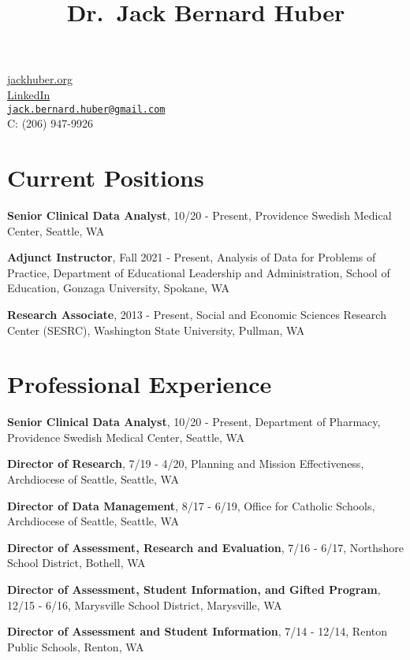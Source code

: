\documentclass[
  letterpaper,
]{article}
\title{Dr.~Jack Bernard Huber}
\author{}
\date{}
\begin{document}
\maketitle


\href{https://jackhuber.org}{jackhuber.org}\\
\href{https://www.linkedin.com/in/jackbhuber}{LinkedIn}\\
\href{mailto:jack.bernard.huber@gmail.com}{\nolinkurl{jack.bernard.huber@gmail.com}}\\
C: (206) 947-9926

\section{Current Positions}\label{current-positions}

\textbf{Senior Clinical Data Analyst}, 10/20 - Present, Providence
Swedish Medical Center, Seattle, WA

\textbf{Adjunct Instructor}, Fall 2021 - Present, Analysis of Data for
Problems of Practice, Department of Educational Leadership and
Administration, School of Education, Gonzaga University, Spokane, WA

\textbf{Research Associate}, 2013 - Present, Social and Economic
Sciences Research Center (SESRC), Washington State University, Pullman,
WA

\section{Professional Experience}\label{professional-experience}

\textbf{Senior Clinical Data Analyst}, 10/20 - Present, Department of
Pharmacy, Providence Swedish Medical Center, Seattle, WA

\textbf{Director of Research}, 7/19 - 4/20, Planning and Mission
Effectiveness, Archdiocese of Seattle, Seattle, WA

\textbf{Director of Data Management}, 8/17 - 6/19, Office for Catholic
Schools, Archdiocese of Seattle, Seattle, WA

\textbf{Director of Assessment, Research and Evaluation}, 7/16 - 6/17,
Northshore School District, Bothell, WA

\textbf{Director of Assessment, Student Information, and Gifted
Program}, 12/15 - 6/16, Marysville School District, Marysville, WA

\textbf{Director of Assessment and Student Information}, 7/14 - 12/14,
Renton Public Schools, Renton, WA
\end{document}
